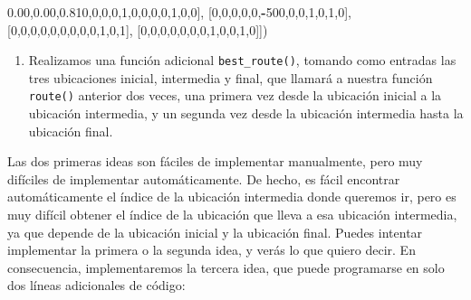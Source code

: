 \documentclass[]{book}
\newenvironment{Shaded}{\begin{snugshade}}{\end{snugshade}}
\newcommand{\DecValTok}[1]{\textcolor[rgb]{0.00,0.00,0.81}{#1}}
\newcommand{\NormalTok}[1]{#1}
\newcommand{\OperatorTok}[1]{\textcolor[rgb]{0.81,0.36,0.00}{\textbf{#1}}}
\providecommand{\tightlist}{%
  \setlength{\itemsep}{0pt}\setlength{\parskip}{0pt}}
\begin{document}
\begin{Shaded}
\begin{Highlighting}[]
\NormalTok{          [}\DecValTok{0}\NormalTok{,}\DecValTok{0}\NormalTok{,}\DecValTok{0}\NormalTok{,}\DecValTok{0}\NormalTok{,}\DecValTok{1}\NormalTok{,}\DecValTok{0}\NormalTok{,}\DecValTok{0}\NormalTok{,}\DecValTok{0}\NormalTok{,}\DecValTok{0}\NormalTok{,}\DecValTok{1}\NormalTok{,}\DecValTok{0}\NormalTok{,}\DecValTok{0}\NormalTok{],}
\NormalTok{          [}\DecValTok{0}\NormalTok{,}\DecValTok{0}\NormalTok{,}\DecValTok{0}\NormalTok{,}\DecValTok{0}\NormalTok{,}\DecValTok{0}\NormalTok{,}\OperatorTok{-}\DecValTok{500}\NormalTok{,}\DecValTok{0}\NormalTok{,}\DecValTok{0}\NormalTok{,}\DecValTok{1}\NormalTok{,}\DecValTok{0}\NormalTok{,}\DecValTok{1}\NormalTok{,}\DecValTok{0}\NormalTok{],}
\NormalTok{          [}\DecValTok{0}\NormalTok{,}\DecValTok{0}\NormalTok{,}\DecValTok{0}\NormalTok{,}\DecValTok{0}\NormalTok{,}\DecValTok{0}\NormalTok{,}\DecValTok{0}\NormalTok{,}\DecValTok{0}\NormalTok{,}\DecValTok{0}\NormalTok{,}\DecValTok{0}\NormalTok{,}\DecValTok{1}\NormalTok{,}\DecValTok{0}\NormalTok{,}\DecValTok{1}\NormalTok{],}
\NormalTok{          [}\DecValTok{0}\NormalTok{,}\DecValTok{0}\NormalTok{,}\DecValTok{0}\NormalTok{,}\DecValTok{0}\NormalTok{,}\DecValTok{0}\NormalTok{,}\DecValTok{0}\NormalTok{,}\DecValTok{0}\NormalTok{,}\DecValTok{1}\NormalTok{,}\DecValTok{0}\NormalTok{,}\DecValTok{0}\NormalTok{,}\DecValTok{1}\NormalTok{,}\DecValTok{0}\NormalTok{]])}
\end{Highlighting}
\end{Shaded}

\begin{enumerate}
\def\labelenumi{\arabic{enumi}.}
\setcounter{enumi}{2}
\tightlist
\item
  Realizamos una función adicional \texttt{best\_route()}, tomando como entradas las tres ubicaciones inicial, intermedia y final, que llamará a nuestra función \texttt{route()} anterior dos veces, una primera vez desde la ubicación inicial a la ubicación intermedia, y un segunda vez desde la ubicación intermedia hasta la ubicación final.
\end{enumerate}

Las dos primeras ideas son fáciles de implementar manualmente, pero muy difíciles de implementar automáticamente. De hecho, es fácil encontrar automáticamente el índice de la ubicación intermedia donde queremos ir, pero es muy difícil obtener el índice de la ubicación que lleva a esa ubicación intermedia, ya que depende de la ubicación inicial y la ubicación final. Puedes intentar implementar la primera o la segunda idea, y verás lo que quiero decir. En consecuencia, implementaremos la tercera idea, que puede programarse en solo dos líneas adicionales de código:
\end{document}
